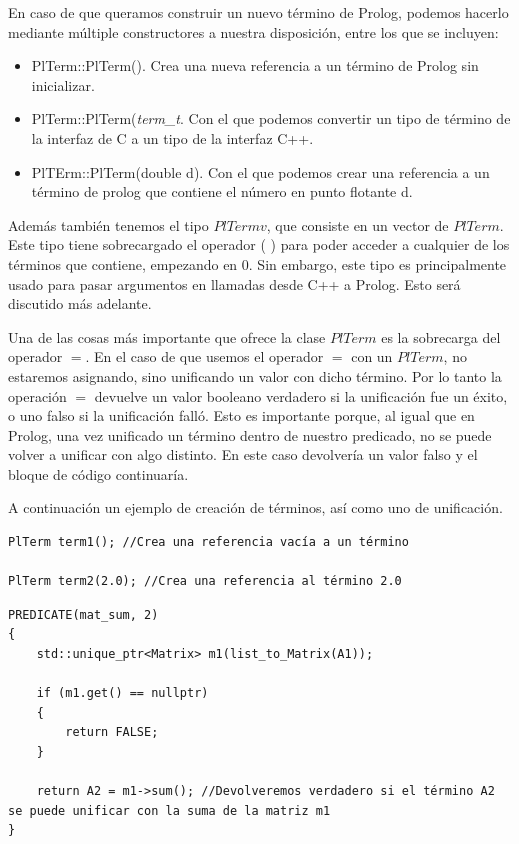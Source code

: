\documentclass[a4paper,12pt]{article}
\begin{document}
En caso de que queramos construir un nuevo término de Prolog, podemos hacerlo mediante múltiple constructores a nuestra disposición, entre los que se incluyen:
\begin{itemize}
\item PlTerm::PlTerm(). Crea una nueva referencia a un término de Prolog sin inicializar.
\item PlTerm::PlTerm(\textit{term\_t}. Con el que podemos convertir un tipo de término de la interfaz de C a un tipo de la interfaz C++.
\item PlTErm::PlTerm(double d). Con el que podemos crear una referencia a un término de prolog que contiene el número en punto flotante d.
\end{itemize}

Además también tenemos el tipo $PlTermv$, que consiste en un vector de $PlTerm$. Este tipo tiene sobrecargado el operador ( ) para poder acceder a cualquier de los términos que contiene, empezando en 0. Sin embargo, este tipo es principalmente usado para pasar argumentos en llamadas desde C++ a Prolog. Esto será discutido más adelante.

Una de las cosas más importante que ofrece la clase $PlTerm$ es la sobrecarga del operador $=$. En el caso de que usemos el operador $=$ con un $PlTerm$, no estaremos asignando, sino unificando un valor con dicho término. Por lo tanto la operación $=$ devuelve un valor booleano verdadero si la unificación fue un éxito, o uno falso si la unificación falló. Esto es importante porque, al igual que en Prolog, una vez unificado un término dentro de nuestro predicado, no se puede volver a unificar con algo distinto. En este caso devolvería un valor falso y el bloque de código continuaría.

A continuación un ejemplo de creación de términos, así como uno de unificación.

\begin{lstlisting}[style=C++]
PlTerm term1(); //Crea una referencia vacía a un término

PlTerm term2(2.0); //Crea una referencia al término 2.0
\end{lstlisting}

\begin{lstlisting}[style=C++]
PREDICATE(mat_sum, 2)
{
    std::unique_ptr<Matrix> m1(list_to_Matrix(A1));
	
	if (m1.get() == nullptr)
	{
		return FALSE;
	}
	
	return A2 = m1->sum(); //Devolveremos verdadero si el término A2 se puede unificar con la suma de la matriz m1
}
\end{lstlisting}
\end{document}

